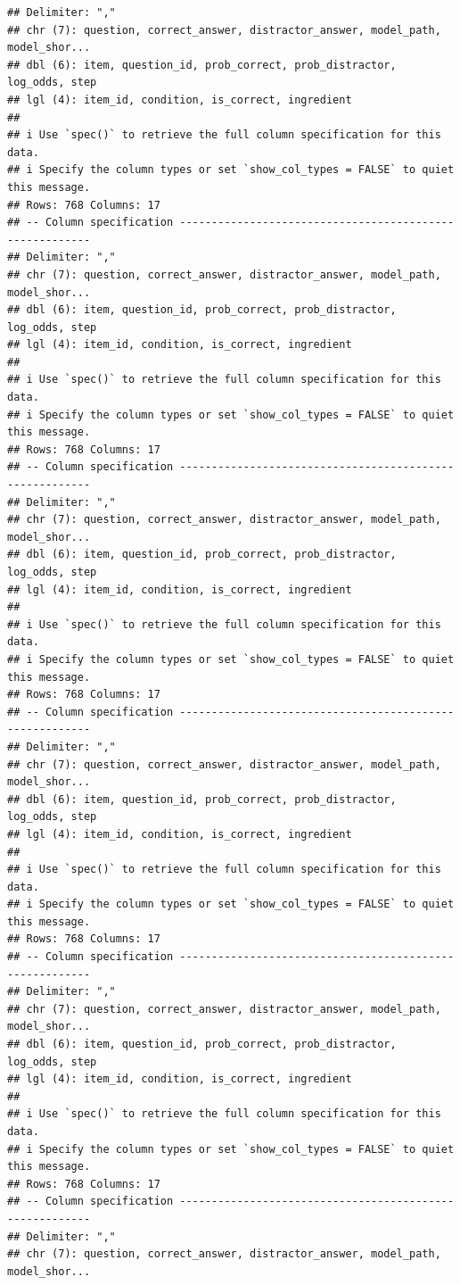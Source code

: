 \documentclass[
]{article}
\begin{document}
\begin{verbatim}
## Delimiter: ","
## chr (7): question, correct_answer, distractor_answer, model_path, model_shor...
## dbl (6): item, question_id, prob_correct, prob_distractor, log_odds, step
## lgl (4): item_id, condition, is_correct, ingredient
## 
## i Use `spec()` to retrieve the full column specification for this data.
## i Specify the column types or set `show_col_types = FALSE` to quiet this message.
## Rows: 768 Columns: 17
## -- Column specification --------------------------------------------------------
## Delimiter: ","
## chr (7): question, correct_answer, distractor_answer, model_path, model_shor...
## dbl (6): item, question_id, prob_correct, prob_distractor, log_odds, step
## lgl (4): item_id, condition, is_correct, ingredient
## 
## i Use `spec()` to retrieve the full column specification for this data.
## i Specify the column types or set `show_col_types = FALSE` to quiet this message.
## Rows: 768 Columns: 17
## -- Column specification --------------------------------------------------------
## Delimiter: ","
## chr (7): question, correct_answer, distractor_answer, model_path, model_shor...
## dbl (6): item, question_id, prob_correct, prob_distractor, log_odds, step
## lgl (4): item_id, condition, is_correct, ingredient
## 
## i Use `spec()` to retrieve the full column specification for this data.
## i Specify the column types or set `show_col_types = FALSE` to quiet this message.
## Rows: 768 Columns: 17
## -- Column specification --------------------------------------------------------
## Delimiter: ","
## chr (7): question, correct_answer, distractor_answer, model_path, model_shor...
## dbl (6): item, question_id, prob_correct, prob_distractor, log_odds, step
## lgl (4): item_id, condition, is_correct, ingredient
## 
## i Use `spec()` to retrieve the full column specification for this data.
## i Specify the column types or set `show_col_types = FALSE` to quiet this message.
## Rows: 768 Columns: 17
## -- Column specification --------------------------------------------------------
## Delimiter: ","
## chr (7): question, correct_answer, distractor_answer, model_path, model_shor...
## dbl (6): item, question_id, prob_correct, prob_distractor, log_odds, step
## lgl (4): item_id, condition, is_correct, ingredient
## 
## i Use `spec()` to retrieve the full column specification for this data.
## i Specify the column types or set `show_col_types = FALSE` to quiet this message.
## Rows: 768 Columns: 17
## -- Column specification --------------------------------------------------------
## Delimiter: ","
## chr (7): question, correct_answer, distractor_answer, model_path, model_shor...

\end{verbatim}
\end{document}
